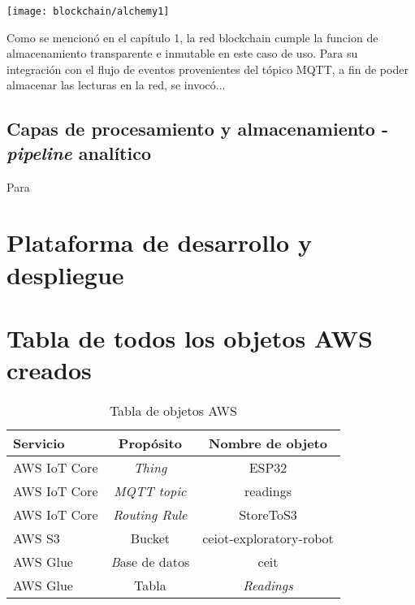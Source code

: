 \begin{center}
   \texttt{[image: blockchain/alchemy1]}
   \label{fig:alchemy1}
\end{center}

Como se mencionó en el capítulo 1, la red blockchain cumple la funcion de almacenamiento transparente e inmutable en este caso de uso. Para su integración con el flujo de eventos provenientes del tópico MQTT, a fin de poder almacenar las lecturas en la red, se invocó...

\subsection{Capas de procesamiento y almacenamiento - \textit{pipeline} analítico}

Para 

\section{Plataforma de desarrollo y despliegue}



\section{Tabla de todos los objetos AWS creados}




\begin{table}[h]
	\centering
	\caption[caption corto]{Tabla de objetos AWS}
	\begin{tabular}{l c c}    
		\toprule
		\textbf{Servicio} & \textbf{Propósito} & \textbf{Nombre de objeto}  \\
		\midrule
		AWS IoT Core & \textit{Thing} & ESP32 \\		
		AWS IoT Core & \textit{MQTT topic} & readings \\		
		AWS IoT Core & \textit{Routing Rule} & StoreToS3 \\		
		AWS S3 & Bucket & ceiot-exploratory-robot \\	
		AWS Glue & \textit Base de datos & ceit \\		
		AWS Glue & Tabla & \textit{Readings} \\		

		\bottomrule
		\hline
	\end{tabular}
	\label{tab:peces}
\end{table}

